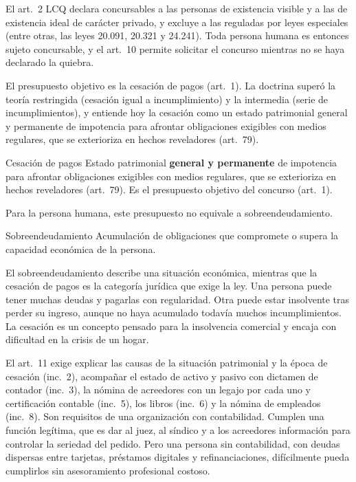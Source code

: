\documentclass[12pt,oneside]{book}
\makeatletter
\renewcommand\section{\@startsection{section}{1}{\z@}{-3.5ex \@plus -1ex \@minus -.2ex}{2.3ex \@plus.2ex}{\normalfont\Large\bfseries\raggedright}}
\makeatother
\begin{document}
El art.~2 LCQ declara concursables a las personas de existencia visible y a las de existencia ideal de carácter privado, y excluye a las reguladas por leyes especiales (entre otras, las leyes 20.091, 20.321 y 24.241). Toda persona humana es entonces sujeto concursable, y el art.~10 permite solicitar el concurso mientras no se haya declarado la quiebra.

El presupuesto objetivo es la cesación de pagos (art.~1). La doctrina superó la teoría restringida (cesación igual a incumplimiento) y la intermedia (serie de incumplimientos), y entiende hoy la cesación como un estado patrimonial general y permanente de impotencia para afrontar obligaciones exigibles con medios regulares, que se exterioriza en hechos reveladores (art.~79).

\begin{definition}{Cesación de pagos}
Estado patrimonial \textbf{general y permanente} de impotencia para afrontar obligaciones exigibles con medios regulares, que se exterioriza en hechos reveladores (art.~79). Es el presupuesto objetivo del concurso (art.~1).
\end{definition}

Para la persona humana, este presupuesto no equivale a sobreendeudamiento.

\begin{definition}{Sobreendeudamiento}
Acumulación de obligaciones que compromete o supera la capacidad económica de la persona.
\end{definition}

El sobreendeudamiento describe una situación económica, mientras que la cesación de pagos es la categoría jurídica que exige la ley. Una persona puede tener muchas deudas y pagarlas con regularidad. Otra puede estar insolvente tras perder su ingreso, aunque no haya acumulado todavía muchos incumplimientos. La cesación es un concepto pensado para la insolvencia comercial y encaja con dificultad en la crisis de un hogar.

\section{El acceso: arts. 10, 11 y 13}
\label{sec:acceso}

El art.~11 exige explicar las causas de la situación patrimonial y la época de cesación (inc.~2), acompañar el estado de activo y pasivo con dictamen de contador (inc.~3), la nómina de acreedores con un legajo por cada uno y certificación contable (inc.~5), los libros (inc.~6) y la nómina de empleados (inc.~8). Son requisitos de una organización con contabilidad. Cumplen una función legítima, que es dar al juez, al síndico y a los acreedores información para controlar la seriedad del pedido. Pero una persona sin contabilidad, con deudas dispersas entre tarjetas, préstamos digitales y refinanciaciones, difícilmente pueda cumplirlos sin asesoramiento profesional costoso.
\end{document}
